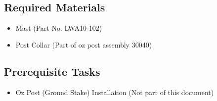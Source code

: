 \documentclass[12pt]{article}
\begin{document}
\begin{enumerate}
	\subsection{Required Materials}
		\begin{itemize}
			\item Mast (Part No. LWA10-102)
			\item Post Collar (Part of oz post assembly 30040)
		\end{itemize}
	\subsection{Prerequisite Tasks}
		\begin{itemize}
			\item Oz Post (Ground Stake) Installation (Not part of this document)
		\end{itemize}

\end{enumerate}
\end{document}
